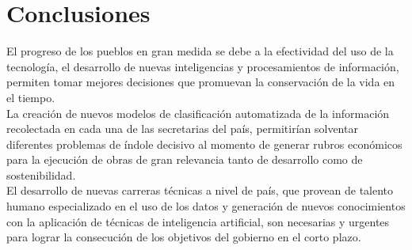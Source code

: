 \documentclass[preprint,12pt,3p]{elsarticle}
\begin{document}
\section{Conclusiones}
\label{sec6}
El progreso de los pueblos en gran medida se debe a la efectividad del uso de la tecnología, el desarrollo de nuevas inteligencias y procesamientos de información, permiten tomar mejores decisiones que promuevan la conservación de la vida en el tiempo.\\

La creación de nuevos modelos de clasificación automatizada de la información recolectada en cada una de las secretarias del país, permitirían solventar diferentes problemas de índole decisivo al momento de generar rubros económicos para la ejecución de obras de gran relevancia tanto de desarrollo como de sostenibilidad.\\

El desarrollo de nuevas carreras técnicas a nivel de país, que provean de talento humano especializado en el uso de los datos y generación de nuevos conocimientos con la aplicación de técnicas de inteligencia artificial, son necesarias y urgentes para lograr la consecución de los objetivos del gobierno en el corto plazo.







% 
% 
% 
% 
% 
% 
% 
% 
% 
% 
% 
% 


\end{document}

